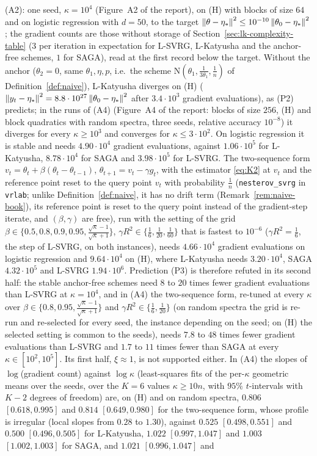 (A2): one seed, $\kappa=10^4$ (Figure~A2 of the report), on (H) with blocks of size $64$ and on logistic regression with $d=50$, to the target $\left\|\theta-\eta_\ast\right\|^2\le10^{-10}\left\|\theta_0-\eta_\ast\right\|^2$; the gradient counts are those without storage of Section~\ref{sec:lk-complexity-table} ($3$ per iteration in expectation for L-SVRG, L-Katyusha and the anchor-free schemes, $1$ for SAGA), read at the first record below the target. Without the anchor ($\theta_2=0$, same $\theta_1,\eta,p$, i.e.\ the scheme $\mathrm N(\theta_1,\frac1{3\theta_1},\frac1n)$ of Definition~\ref{def:naive}), L-Katyusha diverges on (H) ($\left\|y_t-\eta_\ast\right\|^2=8.8\cdot10^{27}\left\|\theta_0-\eta_\ast\right\|^2$ after $3.4\cdot10^3$ gradient evaluations), as (P2) predicts; in the runs of (A4) (Figure~A4 of the report: blocks of size $256$, (H) and block quadratics with random spectra, three seeds, relative accuracy $10^{-8}$) it diverges for every $\kappa\ge10^3$ and converges for $\kappa\le3\cdot10^2$. On logistic regression it is stable and needs $4.90\cdot10^4$ gradient evaluations, against $1.06\cdot10^5$ for L-Katyusha, $8.78\cdot10^4$ for SAGA and $3.98\cdot10^5$ for L-SVRG. The two-sequence form $v_t=\theta_t+\beta(\theta_t-\theta_{t-1})$, $\theta_{t+1}=v_t-\gamma g_t$, with the estimator \eqref{eq:K2} at $v_t$ and the reference point reset to the query point $v_t$ with probability $\frac1n$ (\texttt{nesterov\_svrg} in \texttt{vrlab}; unlike Definition~\ref{def:naive}, it has no drift term (Remark~\ref{rem:naive-book}), its reference point is reset to the query point instead of the gradient-step iterate, and $(\beta,\gamma)$ are free), run with the setting of the grid $\beta\in\{0.5,0.8,0.9,0.95,\frac{\sqrt\kappa-1}{\sqrt\kappa+1}\}$, $\gamma R^2\in\{\frac16,\frac1{20},\frac1{60}\}$ that is fastest to $10^{-6}$ ($\gamma R^2=\frac16$, the step of L-SVRG, on both instances), needs $4.66\cdot10^4$ gradient evaluations on logistic regression and $9.64\cdot10^4$ on (H), where L-Katyusha needs $3.20\cdot10^4$, SAGA $4.32\cdot10^5$ and L-SVRG $1.94\cdot10^6$. Prediction (P3) is therefore refuted in its second half: the stable anchor-free schemes need $8$ to $20$ times fewer gradient evaluations than L-SVRG at $\kappa=10^4$, and in (A4) the two-sequence form, re-tuned at every $\kappa$ over $\beta\in\{0.8,0.95,\frac{\sqrt\kappa-1}{\sqrt\kappa+1}\}$ and $\gamma R^2\in\{\frac16,\frac1{20}\}$ (on random spectra the grid is re-run and re-selected for every seed, the instance depending on the seed; on (H) the selected setting is common to the seeds), needs $7.8$ to $48$ times fewer gradient evaluations than L-SVRG and $1.7$ to $11$ times fewer than SAGA at every $\kappa\in[10^2,10^5]$. Its first half, $\xi\approx1$, is not supported either. In (A4) the slopes of $\log$(gradient count) against $\log\kappa$ (least-squares fits of the per-$\kappa$ geometric means over the seeds, over the $K=6$ values $\kappa\ge10n$, with $95\%$ $t$-intervals with $K-2$ degrees of freedom) are, on (H) and on random spectra, $0.806$ $[0.618,0.995]$ and $0.814$ $[0.649,0.980]$ for the two-sequence form, whose profile is irregular (local slopes from $0.28$ to $1.30$), against $0.525$ $[0.498,0.551]$ and $0.500$ $[0.496,0.505]$ for L-Katyusha, $1.022$ $[0.997,1.047]$ and $1.003$ $[1.002,1.003]$ for SAGA, and $1.021$ $[0.996,1.047]$ and 